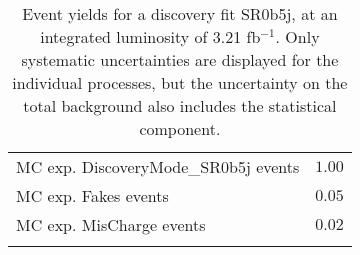 \begin{table}
\begin{center}
{\begin{tabular*}{\textwidth}{@{\extracolsep{\fill}}lr}
        MC exp. DiscoveryMode\_SR0b5j events         & $1.00$              \\
        MC exp. Fakes events         & $0.05$              \\
        MC exp. MisCharge events         & $0.02$              \\
\noalign{\smallskip}\hline\noalign{\smallskip}
\end{tabular*}
}
\end{center}
\caption{Event yields for a discovery fit SR0b5j, at an integrated luminosity of 3.21 fb$^{-1}$. Only systematic uncertainties are displayed for the individual processes, but the uncertainty on the total background also includes the statistical component.}
\label{tab:histfitter:yields:disc:SR0b5j}
\end{table}
%


